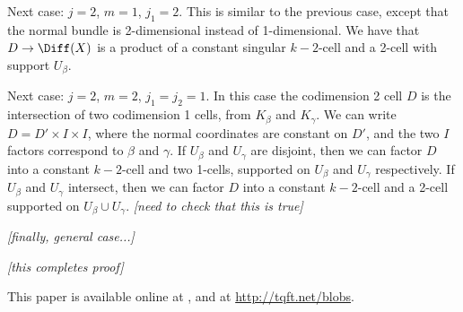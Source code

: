 \documentclass[11pt,leqno]{amsart}
\def\nn#1{{{\it \small [#1]}}}
\begin{document}
Next case: $j=2$, $m=1$, $j_1 = 2$.
This is similar to the previous case, except that the normal bundle is 2-dimensional instead of
1-dimensional.
We have that $D \to \Diff(X)$ is a product of a constant singular $k{-}2$-cell
and a 2-cell with support $U_\beta$.

Next case: $j=2$, $m=2$, $j_1 = j_2 = 1$.
In this case the codimension 2 cell $D$ is the intersection of two
codimension 1 cells, from $K_\beta$ and $K_\gamma$.
We can write $D = D' \times I \times I$, where the normal coordinates are constant
on $D'$, and the two $I$ factors correspond to $\beta$ and $\gamma$.
If $U_\beta$ and $U_\gamma$ are disjoint, then we can factor $D$ into a constant $k{-}2$-cell and
two 1-cells, supported on $U_\beta$ and $U_\gamma$ respectively.
If $U_\beta$ and $U_\gamma$ intersect, then we can factor $D$ into a constant $k{-}2$-cell and
a 2-cell supported on $U_\beta \cup U_\gamma$.
\nn{need to check that this is true}

\nn{finally, general case...}

\nn{this completes proof}






This paper is available online at , and at
\url{http://tqft.net/blobs}.

\end{document}
